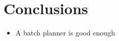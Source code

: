 
\chapter{Conclusions} \label{chapConclusions}

\begin{itemize}
    \item A batch planner is good enough 
\end{itemize}